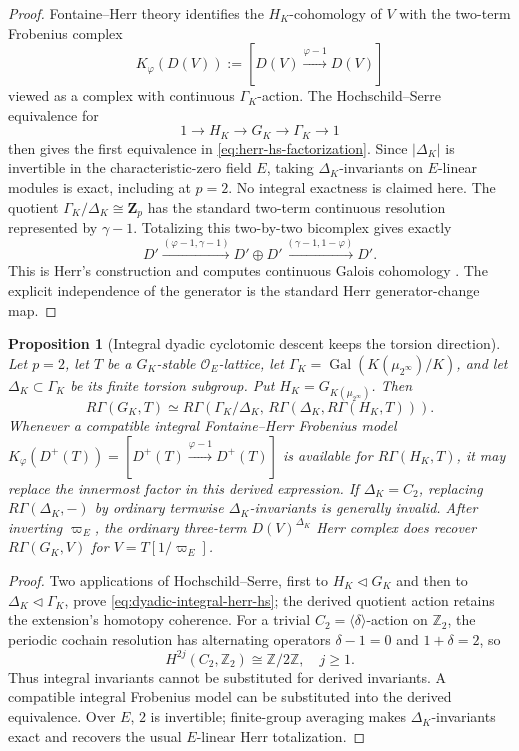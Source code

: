 \documentclass[11pt]{article}
\newtheorem{proposition}[theorem]{Proposition}
\theoremstyle{definition}
\begin{document}
\begin{proof}
Fontaine--Herr theory identifies the $H_K$-cohomology of $V$ with the two-term Frobenius complex
\[
 K_\varphi(D(V))
 :=
 [D(V)\xrightarrow{\varphi-1}D(V)]
\]
viewed as a complex with continuous $\Gamma_K$-action.  The Hochschild--Serre equivalence for
\[
1\longrightarrow H_K\longrightarrow G_K\longrightarrow\Gamma_K\longrightarrow1
\]
then gives the first equivalence in \eqref{eq:herr-hs-factorization}.  Since $|\Delta_K|$ is invertible in the characteristic-zero field $E$, taking $\Delta_K$-invariants on $E$-linear modules is exact, including at $p=2$.  No integral exactness is claimed here.  The quotient $\Gamma_K/\Delta_K\cong\mathbf Z_p$ has the standard two-term continuous resolution represented by $\gamma-1$.  Totalizing this two-by-two bicomplex gives exactly
\[
D'\xrightarrow{(\varphi-1,\gamma-1)}D'\oplus D'
\xrightarrow{(\gamma-1,1-\varphi)}D'.
\]
This is Herr's construction and computes continuous Galois cohomology \cite{HerrSurvey,LiuCohomology,KPXFamilies}.  The explicit independence of the generator is the standard Herr generator-change map.
\end{proof}

\begin{proposition}[Integral dyadic cyclotomic descent keeps the torsion direction]
\label{prop:dyadic-integral-herr-derived}
Let $p=2$, let $T$ be a $G_K$-stable $\mathcal O_E$-lattice,
let $\Gamma_K=\operatorname{Gal}(K(\mu_{2^\infty})/K)$,
and let $\Delta_K\subset\Gamma_K$ be its finite torsion subgroup.
Put $H_K=G_{K(\mu_{2^\infty})}$.  Then
\begin{equation}\label{eq:dyadic-integral-herr-hs}
R\Gamma(G_K,T)\simeq
R\Gamma\!\left(\Gamma_K/\Delta_K,\,
 R\Gamma\!\left(\Delta_K,R\Gamma(H_K,T)\right)\right).
\end{equation}
Whenever a compatible integral Fontaine--Herr Frobenius model
$K_\varphi(D^+(T))
=[D^+(T)\xrightarrow{\varphi-1}D^+(T)]$
is available for $R\Gamma(H_K,T)$, it may replace the
innermost factor in this derived expression.
If $\Delta_K=C_2$, replacing $R\Gamma(\Delta_K,-)$ by
ordinary termwise $\Delta_K$-invariants is generally invalid.
After inverting $\varpi_E$, the ordinary three-term
$D(V)^{\Delta_K}$ Herr complex does recover
$R\Gamma(G_K,V)$ for $V=T[1/\varpi_E]$.
\end{proposition}

\begin{proof}
Two applications of Hochschild--Serre, first to $H_K\triangleleft G_K$
and then to $\Delta_K\triangleleft\Gamma_K$, prove
\eqref{eq:dyadic-integral-herr-hs}; the derived quotient action
retains the extension's homotopy coherence.
For a trivial $C_2=\langle\delta\rangle$-action on $\mathbb Z_2$,
the periodic cochain resolution has alternating operators
$\delta-1=0$ and $1+\delta=2$, so
\[
H^{2j}(C_2,\mathbb Z_2)\cong\mathbb Z/2\mathbb Z,
\quad j\ge1.
\]
Thus integral invariants cannot be substituted for
derived invariants.  A compatible integral Frobenius model
can be substituted into the derived equivalence.
Over $E$, $2$ is invertible; finite-group averaging makes
$\Delta_K$-invariants exact and recovers the usual
$E$-linear Herr totalization.
\end{proof}
\end{document}

